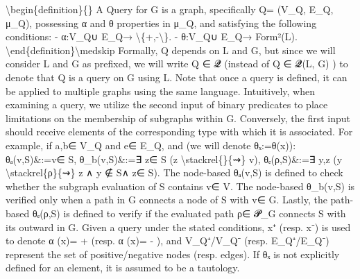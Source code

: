 \documentclass{article}%
\begin{document}
\textbackslash{}begin\{definition\}\{\}\newline%
A Query for G is a graph, specifically Q= (V\_Q, E\_Q, μ\_Q), possessing α and θ properties in μ\_Q, and satisfying the following conditions:\newline%
\newline%
{-} α:V\_Q∪ E\_Q→ \textbackslash{}\{+,{-}\textbackslash{}\}.\newline%
{-} θ:V\_Q∪ E\_Q→ Form²(L).\newline%
\textbackslash{}end\{definition\}\textbackslash{}medskip\newline%
\newline%
Formally, Q depends on L and G, but since we will consider L and G as prefixed, we will write Q ∈ 𝓠 (instead of Q ∈ 𝓠(L, G) ) to denote that Q is a query on G using L. Note that once a query is defined, it can be applied to multiple graphs using the same language.\newline%
\newline%
Intuitively, when examining a query, we utilize the second input of binary predicates to place limitations on the membership of subgraphs within G. Conversely, the first input should receive elements of the corresponding type with which it is associated.\newline%
\newline%
For example, if a,b∈ V\_Q and e∈ E\_Q, and (we will denote θₓ:=θ(x)):\newline%
\newline%
θₐ(v,S)\&:=v∈ S,\newline%
\newline%
θ\_b(v,S)\&:=∃ z∈ S (z \textbackslash{}stackrel\{\}\{⇝\} v),\newline%
\newline%
θₑ(ρ,S)\&:=∃ y,z (y \textbackslash{}stackrel\{ρ\}\{⇝\} z ∧ y ∉ S∧ z∈ S).\newline%
\newline%
The node{-}based θₐ(v,S) is defined to check whether the subgraph evaluation of S contains v∈ V. The node{-}based θ\_b(v,S) is verified only when a path in G connects a node of S with v∈ G. Lastly, the path{-}based θₑ(ρ,S) is defined to verify if the evaluated path ρ∈ 𝓟\_G connects S with its outward in G.\newline%
\newline%
Given a query under the stated conditions, x⁺ (resp. x⁻) is used to denote α (x)= + (resp. α (x)= {-} ), and V\_Q⁺/V\_Q⁻ (resp. E\_Q⁺/E\_Q⁻) represent the set of positive/negative nodes (resp. edges). If θₓ is not explicitly defined for an element, it is assumed to be a tautology.\newline%
\end{document}
